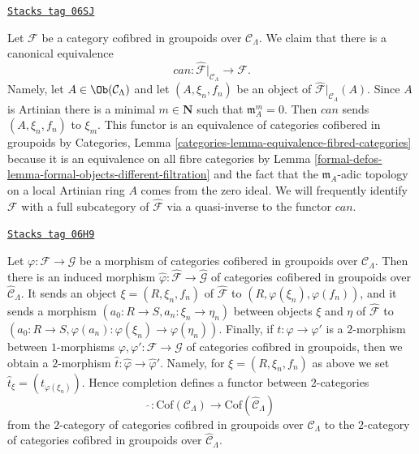 \begin{remark}
\label{formal-defos-remark-restrict-completion}
\href{https://stacks.math.columbia.edu/tag/06SJ}{\texttt{Stacks tag 06SJ}}

Let $\mathcal{F}$ be a category cofibred in groupoids over
$\mathcal{C}_\Lambda$. We claim that there is a canonical
equivalence
$$
can :
\widehat{\mathcal{F}}|_{\mathcal{C}_\Lambda}
\longrightarrow
\mathcal{F}.
$$
Namely, let $A \in \Ob(\mathcal{C}_\Lambda)$ and let
$(A, \xi_n, f_n)$ be an object of
$\widehat{\mathcal{F}}|_{\mathcal{C}_\Lambda}(A)$.
Since $A$ is Artinian there is a minimal $m \in \mathbf{N}$
such that $\mathfrak m_A^m = 0$. Then $can$ sends $(A, \xi_n, f_n)$ to $\xi_m$.
This functor is an equivalence of categories cofibered in groupoids by
Categories, Lemma \ref{categories-lemma-equivalence-fibred-categories}
because it is an equivalence on all fibre categories by
Lemma \ref{formal-defos-lemma-formal-objects-different-filtration}
and the fact that the $\mathfrak m_A$-adic topology on a local
Artinian ring $A$ comes from the zero ideal. We will frequently identify
$\mathcal{F}$ with a full subcategory of $\widehat{\mathcal{F}}$ via a
quasi-inverse to the functor $can$.
\end{remark}

\begin{remark}
\label{formal-defos-remark-completion-morphism}
\href{https://stacks.math.columbia.edu/tag/06H9}{\texttt{Stacks tag 06H9}}

Let $\varphi : \mathcal{F} \to \mathcal{G}$ be a morphism of categories
cofibered in groupoids over $\mathcal{C}_\Lambda$. Then there is an induced
morphism
$\widehat{\varphi}: \widehat{\mathcal{F}} \to \widehat{\mathcal{G}}$
of categories cofibered in groupoids over $\widehat{\mathcal{C}}_\Lambda$.
It sends an object $\xi = (R, \xi_n, f_n)$ of
$\widehat{\mathcal{F}}$ to $(R, \varphi(\xi_n), \varphi(f_n))$, and it sends a
morphism $(a_0 : R \to S, a_n : \xi_n \to \eta_n)$ between
objects $\xi$ and $\eta$ of $\widehat{\mathcal{F}}$ to
$(a_0 : R \to S, \varphi(a_n) : \varphi(\xi_n) \to \varphi(\eta_n))$.
Finally, if $t : \varphi \to \varphi'$ is a $2$-morphism between
$1$-morphisms $\varphi, \varphi': \mathcal{F} \to \mathcal{G}$ of
categories cofibred in groupoids, then we obtain a $2$-morphism
$\widehat{t} : \widehat{\varphi} \to \widehat{\varphi}'$. Namely, for
$\xi = (R, \xi_n, f_n)$ as above we set
$\widehat{t}_\xi = (t_{\varphi(\xi_n)})$. Hence completion defines a
functor between $2$-categories
$$
\widehat{~} :
\text{Cof}(\mathcal{C}_\Lambda)
\longrightarrow
\text{Cof}(\widehat{\mathcal{C}}_\Lambda)
$$
from the $2$-category of categories cofibred in groupoids over
$\mathcal{C}_\Lambda$ to the $2$-category of categories cofibred
in groupoids over $\widehat{\mathcal{C}}_\Lambda$.
\end{remark}

